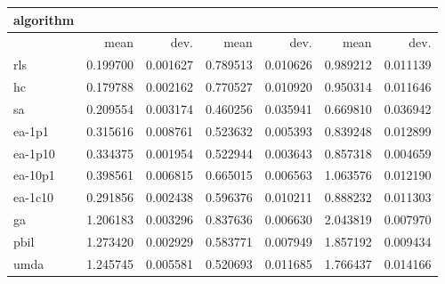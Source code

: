 \begin{tabular}{@{}l*{6}{>{{}}N{1}{2}}@{}}
\toprule
{algorithm} &  &  &  \\
\midrule
& {mean} & {dev.} & {mean} & {dev.} & {mean} & {dev.} \\
\midrule
rls & 0.199700 & 0.001627 & 0.789513 & 0.010626 & 0.989212 & 0.011139 \\
 hc & 0.179788 & 0.002162 & 0.770527 & 0.010920 & 0.950314 & 0.011646 \\
 sa & 0.209554 & 0.003174 & 0.460256 & 0.035941 & 0.669810 & 0.036942 \\
 ea-1p1 & 0.315616 & 0.008761 & 0.523632 & 0.005393 & 0.839248 & 0.012899 \\
 ea-1p10 & 0.334375 & 0.001954 & 0.522944 & 0.003643 & 0.857318 & 0.004659 \\
 ea-10p1 & 0.398561 & 0.006815 & 0.665015 & 0.006563 & 1.063576 & 0.012190 \\
 ea-1c10 & 0.291856 & 0.002438 & 0.596376 & 0.010211 & 0.888232 & 0.011303 \\
 ga & 1.206183 & 0.003296 & 0.837636 & 0.006630 & 2.043819 & 0.007970 \\
 pbil & 1.273420 & 0.002929 & 0.583771 & 0.007949 & 1.857192 & 0.009434 \\
 umda & 1.245745 & 0.005581 & 0.520693 & 0.011685 & 1.766437 & 0.014166 \\
 \bottomrule
\end{tabular}
